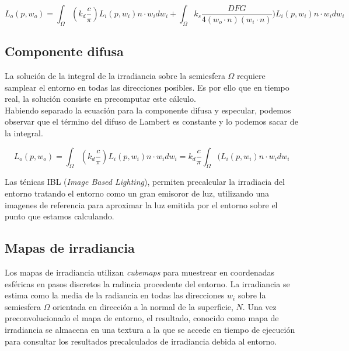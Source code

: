     \begin{equation}
    L_o(p, w_o) = \int_{\Omega}
    (k_d \frac{c}{\pi}) L_i(p, w_i)n\cdot{w_i}dw_i +
    \int_{\Omega} 
    k_s \frac{DFG}{4(w_o\cdot{n})(w_i\cdot{n})})L_i(p, w_i)n\cdot{w_i}dw_i
    \end{equation}
    \singlespacing
    
        \subsection{Componente difusa}
        La soluci\'on de la integral de la irradiancia sobre la semiesfera $\Omega$ requiere samplear el entorno
        en todas las direcciones posibles. Es por ello que en tiempo real, la soluci\'on consiste en
        precomputar este c\'alculo.\\
    
        Habiendo separado la ecuaci\'on para la componente difusa y especular, podemos observar que el t\'ermino del difuso
        de Lambert es constante y lo podemos sacar de la integral.
    
        \begin{equation}
        L_o(p, w_o) = \int_{\Omega}
        (k_d \frac{c}{\pi}) L_i(p, w_i)n\cdot{w_i}dw_i=
        k_d \frac{c}{\pi} \int_{\Omega}
        (L_i(p, w_i)n\cdot{w_i}dw_i
        \end{equation}
        \singlespacing
    
        Las t\'enicas IBL (\textit{Image Based Lighting}), permiten precalcular la irradiacia del entorno tratando el entorno
        como un gran emisoror de luz, utilizando una imagenes de referencia para aproximar la luz emitida por el entorno sobre
        el punto que estamos calculando.\\

            \subsection*{Mapas de irradiancia}
            Los mapas de irradiancia utilizan \textit{cubemaps} para muestrear en coordenadas esf\'ericas en pasos discretos la radincia
            procedente del entorno. La irradiancia se estima como la media de la radiancia en todas las direcciones $w_i$ sobre la
            semiesfera $\Omega$ orientada en direcci\'on a la normal de la superficie, $N$. Una vez preconvolucionado el mapa de
            entorno, el resultado, conocido como mapa de irradiancia se almacena en una textura a la que se accede en tiempo
            de ejecuci\'on para consultar los resultados precalculados de irradiancia debida al entorno.

